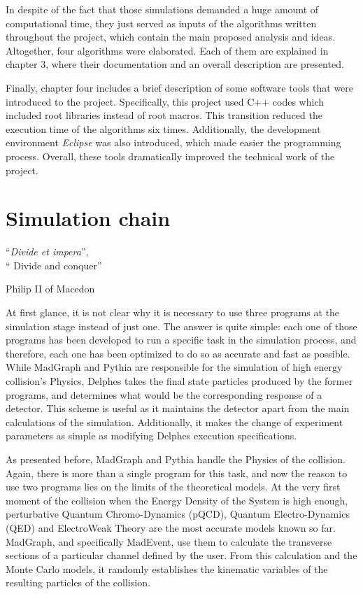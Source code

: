 \documentclass[12pt, oneside]{book}              %
\begin{document}
In despite of the fact that those simulations demanded a huge amount of computational
time, they just served as inputs of the algorithms written throughout the project,
which contain the main proposed analysis and ideas. Altogether, four algorithms
were elaborated. Each of them are explained in chapter 3, where their documentation
and an overall description are presented. 

Finally, chapter four includes a brief description of some software tools that
were introduced to the project. Specifically, this project used C++ codes which
included root libraries instead of root macros. This transition reduced the 
execution time of the algorithms six times. Additionally, the development 
environment \emph{Eclipse} was also introduced, which made easier the programming
process. Overall, these tools dramatically improved the technical work of the project.

\chapter{Simulation chain} \label{cha:Simulation_chain}

\epigraph{\textquotedblleft \textit{Divide et impera}\textquotedblright, \\ \textquotedblleft
Divide and conquer\textquotedblright}{Philip II of Macedon}

At first glance, it is not clear why it is necessary to use three programs at the
simulation stage instead of just one. The answer is quite simple: each one of those
programs has been developed to run a specific task in the simulation process, and 
therefore, each one has been optimized to do so as accurate and fast as possible. 
While MadGraph and Pythia are responsible for the simulation of high energy collision's 
Physics, Delphes takes the final state particles produced by the former programs, and
determines what would be the corresponding response of a detector. This scheme is
useful as it maintains the detector apart from the main calculations of the simulation.
Additionally, it makes the change of experiment parameters as simple as modifying
Delphes execution specifications.

As presented before, MadGraph and Pythia handle the Physics of the collision. Again,
there is more than a single program for this task, and now the reason to use two programs lies on the
limits of the theoretical models. At the very first moment of the collision when
the Energy Density of the System is high enough, perturbative Quantum Chromo-Dynamics
(pQCD), Quantum Electro-Dynamics (QED) and ElectroWeak Theory are the most accurate models
known so far. MadGraph, and specifically MadEvent, use them to calculate the transverse
sections of a particular channel defined by the user. From this calculation and the Monte 
Carlo models, it randomly establishes the kinematic variables of the resulting particles
of the collision.
\end{document}
